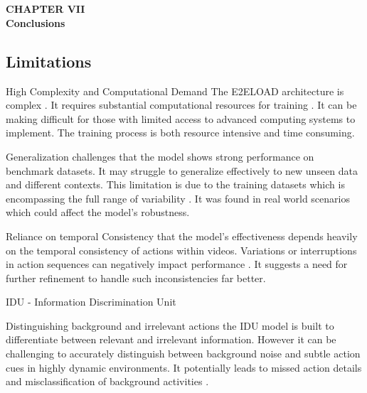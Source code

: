 \section*{}
\begin{center}
    {\fontsize{14}{1.5}\selectfont \textbf{CHAPTER VII}}\\
    \vspace{12pt}
    {\fontsize{16}{1.5}\selectfont \textbf{Conclusions}}\\
    \vspace{12pt}
    \vspace{12pt}
\end{center}

\setcounter{section}{7}
\setcounter{subsection}{0}

\subsection{Limitations} { 

High Complexity and Computational Demand  The E2ELOAD architecture is complex . It requires substantial computational resources for training  . It can be making  difficult for those with limited access to advanced computing systems to implement. The training process is both resource intensive and time consuming. 

Generalization challenges that the model shows strong performance on benchmark datasets.  It may struggle to generalize effectively to new unseen data and different contexts. This limitation is due to the training datasets which is encompassing the full range of variability .  It was found in real world scenarios which could affect the model's robustness.

Reliance on temporal Consistency  that the model's effectiveness depends heavily on the temporal consistency of actions within videos. Variations or interruptions in action sequences can negatively impact performance . It suggests a need for further refinement to handle such inconsistencies far better.

IDU - Information Discrimination Unit

Distinguishing background and irrelevant actions  the IDU model is built to differentiate between relevant and irrelevant information. However it can be challenging to accurately distinguish between background noise and subtle action cues in highly dynamic environments. It potentially leads to missed action details and misclassification of background activities .

}
